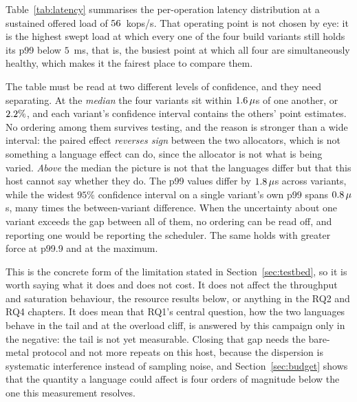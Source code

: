 \documentclass[english,twoside,openright,a4paper,censored,csm,software-track-2020]{HYthesisML}
\begin{document}
Table~\ref{tab:latency} summarises the per-operation latency distribution at a sustained
offered load of $56$~kops/s. That operating point is not chosen by eye: it is the
highest swept load at which every one of the four build variants still holds its p99 below
$5$~ms, that is, the busiest point at which all four are simultaneously healthy, which makes
it the fairest place to compare them.

The table must be read at two different levels of confidence, and they need separating. At the
\emph{median} the four variants sit within
$1.6\,\mu$s of one another, or $2.2\%$, and each variant's confidence
interval contains the others' point estimates. No ordering among them survives testing, and
the reason is stronger than a wide interval: the paired effect \emph{reverses sign} between
the two allocators, which is not something a language effect can do, since the allocator is
not what is being varied. \emph{Above} the median the picture is not that the languages differ
but that this host cannot say whether they do. The p99 values differ by
$1.8\,\mu$s across variants, while the widest $95\%$ confidence interval on a
single variant's own p99 spans $0.8\,\mu$s, many times the between-variant
difference. When the uncertainty about one variant exceeds the gap between all of them, no
ordering can be read off, and reporting one would be reporting the scheduler. The same holds
with greater force at p99.9 and at the maximum.

This is the concrete form of the limitation stated in Section~\ref{sec:testbed}, so it is worth
saying what it does and
does not cost. It does not affect the throughput
and saturation behaviour, the resource results below, or anything in the RQ2 and RQ4 chapters.
It does mean that RQ1's central question, how the two languages behave in the tail and at the
overload cliff, is answered by this campaign only in the negative: the tail is not yet
measurable. Closing that gap needs the bare-metal protocol and not more repeats on this
host, because the dispersion is systematic interference instead of sampling noise, and
Section~\ref{sec:budget} shows that the quantity a language could affect is four orders of
magnitude below the one this measurement resolves.
\end{document}
